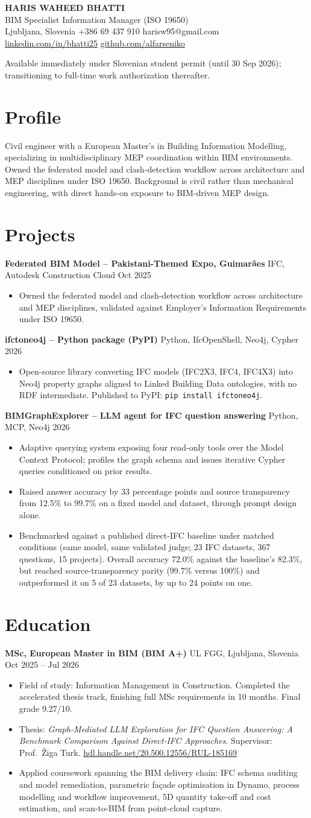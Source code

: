 \documentclass[a4paper,10.5pt]{article}
\newcommand{\datefill}{\dotfill}
\newcommand{\entry}[3]{\vspace{2.5pt}\noindent\textbf{#1} \textbar{} #2 \datefill{} #3\par\vspace{0.5pt}}
\newcommand{\ROLELINE}{BIM Specialist \textbar{} Information Manager (ISO 19650)}
\newcommand{\projIfcToNeo}{%
\entry{ifctoneo4j -- Python package (PyPI)}{Python, IfcOpenShell, Neo4j, Cypher}{2026}
\begin{itemize}
  \item Open-source library converting IFC models (IFC2X3, IFC4, IFC4X3) into Neo4j
        property graphs aligned to Linked Building Data ontologies, with no RDF
        intermediate. Published to PyPI: \texttt{pip install ifctoneo4j}.
\end{itemize}}
\newcommand{\projBIMGraph}{%
\entry{BIMGraphExplorer -- LLM agent for IFC question answering}{Python, MCP, Neo4j}{2026}
\begin{itemize}
  \item Adaptive querying system exposing four read-only tools over the Model
        Context Protocol; profiles the graph schema and issues iterative Cypher
        queries conditioned on prior results.
  \item Raised answer accuracy by 33 percentage points and source transparency from
        12.5\% to 99.7\% on a fixed model and dataset, through prompt design alone.
  \item Benchmarked against a published direct-IFC baseline under matched
        conditions (same model, same validated judge; 23 IFC datasets, 367
        questions, 15 projects). Overall accuracy 72.0\% against the baseline's
        82.3\%, but reached source-transparency parity (99.7\% versus 100\%) and
        outperformed it on 5 of 23 datasets, by up to 24 points on one.
\end{itemize}}
\newcommand{\projGuimaraes}{%
\entry{Federated BIM Model -- Pakistani-Themed Expo, Guimar\~aes}{IFC, Autodesk Construction Cloud}{Oct 2025}
\begin{itemize}
  \item Owned the federated model and clash-detection workflow across architecture
        and MEP disciplines, validated against Employer's Information Requirements
        under ISO 19650.
\end{itemize}}
\begin{document}
\begin{center}
  {\LARGE\bfseries HARIS WAHEED BHATTI}\\[2pt]
  {\large \ROLELINE}\\[3pt]
  Ljubljana, Slovenia \textbar{} +386 69 437 910 \textbar{} harisw95@gmail.com\\
  \href{https://linkedin.com/in/bhatti25}{linkedin.com/in/bhatti25} \textbar{}
  \href{https://github.com/alfarseniko}{github.com/alfarseniko}
\end{center}
\vspace{-4pt}
\noindent\small Available immediately under Slovenian student permit (until 30 Sep 2026); transitioning to full-time work authorization thereafter.\normalsize

\section{Profile}

\noindent Civil engineer with a European Master's in Building Information Modelling,
specializing in multidisciplinary MEP coordination within BIM environments. Owned
the federated model and clash-detection workflow across architecture and MEP
disciplines under ISO 19650. Background is civil rather than mechanical engineering,
with direct hands-on exposure to BIM-driven MEP design.

\section{Projects}

 \projGuimaraes \projIfcToNeo \projBIMGraph

\section{Education}
\entry{MSc, European Master in BIM (BIM A+)}{UL FGG, Ljubljana, Slovenia}{Oct 2025 -- Jul 2026}
\begin{itemize}
  \item Field of study: Information Management in Construction. Completed the
        accelerated thesis track, finishing full MSc requirements in 10 months.
        Final grade 9.27/10.
  \item Thesis: \textit{Graph-Mediated LLM Exploration for IFC Question Answering:
        A Benchmark Comparison Against Direct-IFC Approaches}. Supervisor:
        Prof.~\v{Z}iga Turk. \href{http://hdl.handle.net/20.500.12556/RUL-185169}{hdl.handle.net/20.500.12556/RUL-185169}
  \item Applied coursework spanning the BIM delivery chain: IFC schema auditing and model remediation, parametric façade optimisation in Dynamo, process modelling and workflow improvement, 5D quantity take-off and cost estimation, and scan-to-BIM from point-cloud capture.
\end{itemize}
\end{document}

